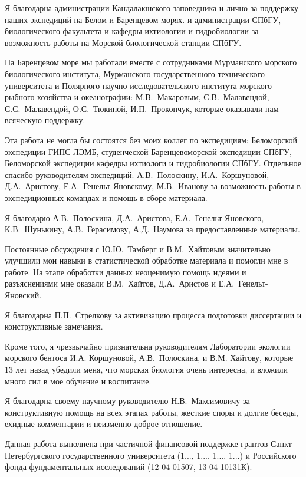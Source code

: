 Я благодарна администрации Кандалакшского заповедника и лично  за поддержку наших экспедиций на Белом и Баренцевом морях.
и администрации СПбГУ, биологического факультета и кафедры ихтиологии и гидробиологии за возможность работы на Морской биологической станции СПбГУ.

На Баренцевом море мы работали вместе с сотрудниками Мурманского морского биологического института, Мурманского государственного технического университета и Полярного научно-исследовательского института морского рыбного хозяйства и океанографии: М.\:В.~Макаровым, С.\:В.~Малавендой, С.\:С.~Малавендой, О.\:С.~Тюкиной, И.\:П.~Прокопчук, которые оказывали нам всяческую поддержку.  

Эта работа не могла бы состоятся без моих коллег по экспедициям: Беломорской экспедиции ГИПС ЛЭМБ, студенческой Баренцевоморской экспедиции СПбГУ, Беломорской экспедиции кафедры ихтиологи и гидробиологии СПбГУ. 
Отдельное спасибо руководителям экспедиций: А.\:В.~Полоскину, И.\:А.~Коршуновой, Д.\:А.~Аристову, Е.\:А.~Генельт-Яновскому, М.В.~Иванову за возможность работы в экспедиционных командах и помощь в сборе материала.

Я благодарю А.\:В.~Полоскина, Д.\:А.~Аристова, Е.\:А.~Генельт-Яновского, К.\:В.~Шунькину, А.\:В.~Герасимову, А.\:Д.~Наумова за предоставленные материалы.

Постоянные обсуждения с Ю.\:Ю.~Тамберг и В.\:М.~Хайтовым значительно улучшили мои навыки в статистической обработке материала и помогли мне в работе.
На этапе обработки данных неоценимую помощь идеями и разъяснениями мне оказали В.\:М.~Хайтов, Д.\:А.~Аристов и Е.\:А.~Генельт-Яновский.

Я благодарна П.\:П.~Стрелкову за активизацию процесса подготовки диссертации и конструктивные замечания.

Кроме того, я чрезвычайно признательна руководителям Лаборатории экологии морского бентоса И.\:А. Коршуновой, А.\:В.~Полоскина,  и В.\:М. Хайтову, которые 13 лет назад убедили меня, что морская биология очень интересна, и вложили много сил в мое обучение и воспитание. 


Я благодарна своему научному руководителю Н.\:В.~Максимовичу за конструктивную помощь на всех этапах работы, жесткие споры и долгие беседы, ехидные комментарии и неизменно доброе отношение.

\vspace{3ex}

Данная работа выполнена при частичной финансовой поддержке грантов Санкт-Петер\-бург\-ского государственного университета (1..., 1..., 1..., 1...) и Российского фонда фундаментальных исследований (12-04-01507, 13-04-10131\:К). 

